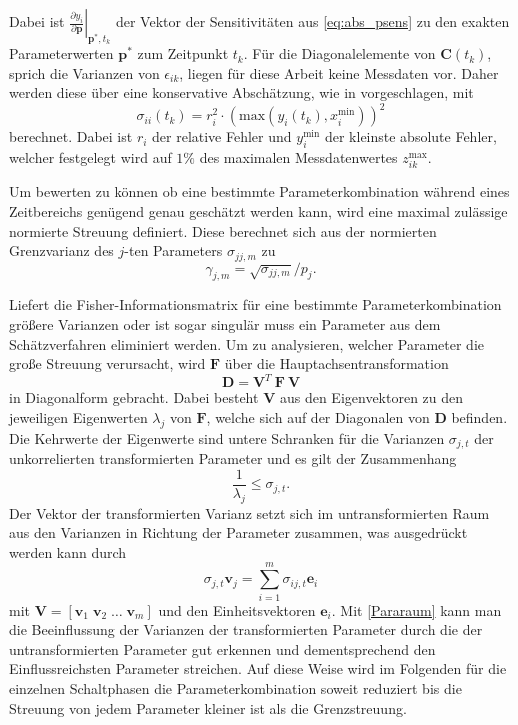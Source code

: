 Dabei ist $\left.\frac{\partial y_i}{\partial \pmb{p}}\right|_{\pmb{p}^*,t_k}$ der Vektor der Sensitivitäten aus \eqref{eq:abs_psens} zu den exakten Parameterwerten $\pmb{p}^*$ zum Zeitpunkt $t_k$. Für die Diagonalelemente von $\pmb{C}(t_k)$, sprich die Varianzen von $\epsilon_{ik}$, liegen für diese Arbeit keine Messdaten vor. Daher werden diese über eine konservative Abschätzung, wie in \cite{Majer.1998} vorgeschlagen, mit
\begin{equation}
\sigma_{ii}(t_k)=r_i^2\cdot\left(\mathrm{max}\left(y_i(t_k),x_i^\mathrm{min}\right)\right)^2
\end{equation}
berechnet. Dabei ist $r_i$ der relative Fehler und $y_i^\mathrm{min}$ der kleinste absolute Fehler, welcher festgelegt wird auf $1\%$ des maximalen Messdatenwertes $z^\mathrm{max}_{ik}$.

Um bewerten zu können ob eine bestimmte Parameterkombination während eines Zeitbereichs genügend genau geschätzt werden kann, wird eine maximal zulässige normierte Streuung definiert. Diese berechnet sich aus der normierten Grenzvarianz des $j$-ten Parameters $\sigma_{jj,m}$ zu 
\begin{equation}
\gamma_{j,m} = \sqrt{\sigma_{jj,m}}/p_j.
\end{equation}

Liefert die Fisher-Informationsmatrix für eine bestimmte Parameterkombination   größere Varianzen oder ist sogar singulär muss ein Parameter aus dem Schätzverfahren eliminiert werden. Um zu analysieren, welcher Parameter die große Streuung verursacht, wird $\pmb{F}$ über die Hauptachsentransformation
\begin{equation}
\pmb{D} = \pmb{V}^T\ \pmb{F}\ \pmb{V}
\end{equation} 
in Diagonalform gebracht. Dabei besteht $\pmb{V}$ aus den Eigenvektoren zu den jeweiligen Eigenwerten $\lambda_j$ von $\pmb{F}$, welche sich auf der Diagonalen von $\pmb{D}$ befinden. Die Kehrwerte der Eigenwerte sind untere Schranken für die  Varianzen $\sigma_{j,t}$ der unkorrelierten transformierten Parameter und es gilt der Zusammenhang
\begin{equation}
\frac{1}{\lambda_j}\leq \sigma_{j,t}.
\end{equation}
Der Vektor der transformierten Varianz setzt sich im untransformierten Raum aus den Varianzen in Richtung der Parameter zusammen, was ausgedrückt werden kann durch
\begin{equation}\label{Pararaum}
\sigma_{j,t} \pmb{v}_j = \sum_{i=1}^m \sigma_{ij,t} \pmb{e}_i
\end{equation}
mit $\pmb{V} = [\pmb{v}_1\; \pmb{v}_2\; \dots \;\pmb{v}_m]$ und den Einheitsvektoren $\pmb{e}_i$. Mit \eqref{Pararaum} kann man die Beeinflussung der Varianzen der transformierten Parameter durch die der untransformierten Parameter gut erkennen und dementsprechend den Einflussreichsten Parameter streichen. Auf diese Weise wird im Folgenden für die einzelnen Schaltphasen die Parameterkombination soweit reduziert bis die Streuung von jedem Parameter kleiner ist als die Grenzstreuung.
 

